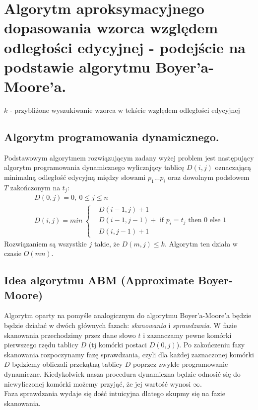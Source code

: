 \section{Algorytm aproksymacyjnego dopasowania wzorca względem odległości edycyjnej - podejście na podstawie algorytmu Boyer'a-Moore'a.}

\begin{algorithm}[H]
    \caption{$k$ - przybliżone wyszukiwanie wzorca w tekście względem odległości edycyjnej}
\end{algorithm}

\subsection{Algorytm programowania dynamicznego.}
Podstawowym algorytmem rozwiązującym zadany wyżej problem jest następujący algorytm programowania dynamicznego wyliczający tablicę $D(i,j)$ oznaczającą minimalną odległość edycyjną między słowami $p_1...p_i$ oraz dowolnym podsłowem $T$ zakończonym na $t_j$:
\begin{align*}
    & D(0,j) = 0,\ 0 \leq j \leq n \\
    & D(i, j) = min\ \left\{\begin{array}{ll}
         &  D(i-1,j)+1\\
         &  D(i-1,j-1) + \text{ if } p_i = t_j \text{ then } 0 \text{ else } 1 \\
         &  D(i, j-1)+1
    \end{array} \right.
\end{align*}
Rozwiązaniem są wszystkie $j$ takie, że $D(m,j) \leq k$. Algorytm ten działa w czasie $O(mn)$.

\subsection{Idea algorytmu ABM (Approximate Boyer-Moore)}

Algorytm oparty na pomyśle analogicznym do algorytmu Boyer'a-Moore'a będzie będzie działać w dwóch głównych fazach: \textit{skanowania} i \textit{sprawdzania}. 
W fazie skanowania przechodzimy przez dane słowo $t$ i zaznaczamy pewne komórki pierwszego rzędu tablicy $D$ (tj komórki postaci $D(0,j)$). 
Po zakończeniu fazy skanowania rozpoczynamy fazę sprawdzania, czyli dla każdej zaznaczonej komórki $D$ będziemy obliczali przekątną tablicy $D$ poprzez zwykłe programowanie dynamiczne. 
Kiedykolwiek nasza procedura dynamiczna będzie odnosić się do niewyliczonej komórki możemy przyjąć, że jej wartość wynosi $\infty.$\\
Faza sprawdzania wydaje się dość intuicyjna dlatego skupmy się na fazie skanowania.\\

